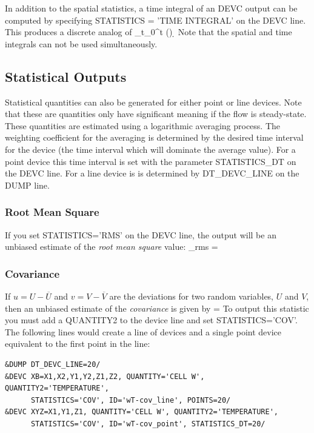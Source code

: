 \documentclass[11pt]{book}
\begin{document}
In addition to the spatial statistics, a time integral of an {\ct DEVC} output can be computed by specifying
{\ct STATISTICS = 'TIME INTEGRAL'} on the {\ct DEVC} line. This produces a discrete analog of
\be
 \int_{t_0}^t \phi(\tau) \; \d \tau
\ee
Note that the spatial and time integrals can not be used simultaneously.

\subsection{Statistical Outputs}
\label{info:rmscovcorr}

Statistical quantities can also be generated for either point or line devices.  Note that these are quantities only have significant meaning if the flow is steady-state.  These quantities are estimated using a logarithmic averaging process.  The weighting coefficient for the averaging is determined by the desired time interval for the device (the time interval which will dominate the average value).  For a point device this time interval is set with the parameter {\ct STATISTICS\_DT} on the {\ct DEVC} line.  For a line device is is determined by {\ct DT\_DEVC\_LINE} on the {\ct DUMP} line.

\subsubsection{Root Mean Square}
\label{info:rms}

If you set {\ct STATISTICS='RMS'} on the {\ct DEVC} line, the output will be an unbiased estimate of the {\em root mean square} value:
\be
   \phi_{\rm rms} = 
\ee

\subsubsection{Covariance}
\label{info:covariance}

If $u = U - \overline{U}$ and $v= V-\overline{V}$ are the deviations for two random variables, $U$ and $V$, then an unbiased estimate of the \emph{covariance} is given by
\be
    = 
\ee
To output this statistic you must add a {\ct QUANTITY2} to the device line and set {\ct STATISTICS='COV'}.  The following lines would create a line of devices and a single point device equivalent to the first point in the line:
\begin{lstlisting}
&DUMP DT_DEVC_LINE=20/
&DEVC XB=X1,X2,Y1,Y2,Z1,Z2, QUANTITY='CELL W', QUANTITY2='TEMPERATURE',
      STATISTICS='COV', ID='wT-cov_line', POINTS=20/
&DEVC XYZ=X1,Y1,Z1, QUANTITY='CELL W', QUANTITY2='TEMPERATURE',
      STATISTICS='COV', ID='wT-cov_point', STATISTICS_DT=20/
\end{lstlisting}
\end{document}
